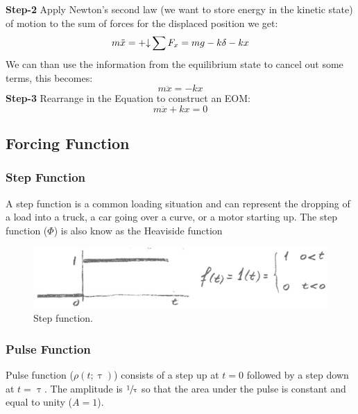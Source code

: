 \documentclass[12pt,letter]{article}
\begin{document}
\begin{example}
			\noindent \textbf{Step-2} Apply Newton's second law (we want to store energy in the kinetic state) of motion to the sum of forces for the displaced position we get: 		
			\begin{equation}
				m\ddot{x} = \mathbin{+\mathord\downarrow} \sum F_x =mg -k\delta -kx
			\end{equation}
			We can than use the information from the equilibrium state to cancel out some terms, this becomes:
			\begin{equation}
				m\ddot{x} = -kx
			\end{equation}				
			\textbf{Step-3} Rearrange in the Equation to construct an EOM: 					
			\begin{equation}
				m\ddot{x} + kx = 0
			\end{equation}			
		\end{example}	




\subsection{Forcing Function}

\subsubsection{Step Function}

A step function is a common loading situation and can represent the dropping of a load into a truck, a car going over a curve, or a motor starting up. The step function ($\Phi$) is also know as the Heaviside function

\begin{figure}[H]
	\centering
	\includegraphics[width=6.5in]{../figures/step.png}
	\caption{Step function.}
\end{figure}



\subsubsection{Pulse Function}

Pulse function ($\rho(t;\uptau)$) consists of a step up at $t=0$ followed by a step down at $t=\uptau$. The amplitude is $\sfrac{1}{\uptau}$ so that the area under the pulse is constant and equal to unity ($A=1$). 
\end{document}
